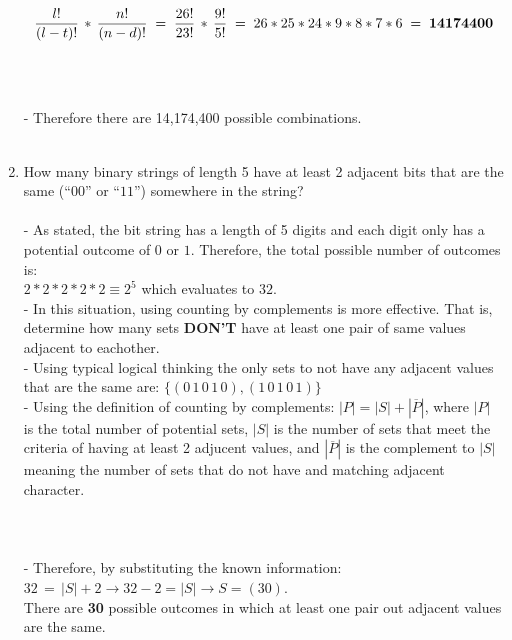 \documentclass{amsart}
\theoremstyle{definition}
\theoremstyle{Exercise}
\theoremstyle{remark}
\theoremstyle{rule}
\numberwithin{equation}{section}
\begin{document}
\begin{enumerate}[label=(\alph*)]
  $$\frac{l!}{(l-t)!} \,*\, \frac{n!}{(n-d)!}\;=\; \frac{26!}{23!} \,*\, \frac{9!}{5!}\;=\; 26*25*24*9*8*7*6\;=\; \bf{14174400}$$\\
  \\\\
  - Therefore there are 14,174,400 possible combinations.
\\\\
    \item How many binary strings of length 5 have at least 2 adjacent bits that are the same (``$00$'' or ``$11$'') somewhere in the string?
\\\\
  - As stated, the bit string has a length of 5 digits and each digit only has a potential outcome of $0$ or $1$. Therefore, the total possible number of outcomes is:\\
  $2*2*2*2*2 \equiv 2^5$ which evaluates to $32$.\\
  - In this situation, using counting by complements is more effective. That is, determine how many sets \textbf{DON'T} have at least one pair of same values adjacent to eachother.\\
  - Using typical logical thinking the only sets to not have any adjacent values that are the same are: $\{(0\,1\,0\,1\,0),(1\,0\,1\,0\,1)\}$\\
  - Using the definition of counting by complements: $|P|=|S|+|\overline{P}|$, where $|P|$ is the total number of potential sets, $|S|$ is the number of 
  sets that meet the criteria of having at least 2 adjucent values, and $|\overline{P}|$ is the complement to $|S|$ meaning the number of sets that do not have 
  and matching adjacent character.
  \\\\
  \vspace*{0.2in}
  \\\\
  - Therefore, by substituting the known information: $32\,=\,|S| + 2 \rightarrow 32-2=|S| \rightarrow S= (30)$.\\
  There are \textbf{30} possible outcomes in which at least one pair out adjacent values are the same.\\ 
\\\\
  \end{enumerate}
\newpage
  \section*{}
\end{document}
